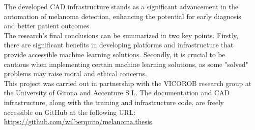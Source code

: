 The developed CAD infrastructure stands as a significant advancement in the
automation of melanoma detection, enhancing the potential for early diagnosis
and better patient outcomes. \\

The research's final conclusions can be summarized in two key points. Firstly,
there are significant benefits in developing platforms and infrastructure that
provide accessible machine learning solutions. Secondly, it is crucial to be
cautious when implementing certain machine learning solutions, as some "solved"
problems may raise moral and ethical concerns. \\

This project was carried out in partnership with the VICOROB
research group at the University of Girona and Accenture S.L. The documentation
and CAD infrastructure, along with the training and infrastructure code, are
freely accessible on GitHub at the following URL:
\url{https://github.com/wilberquito/melanoma.thesis}.
